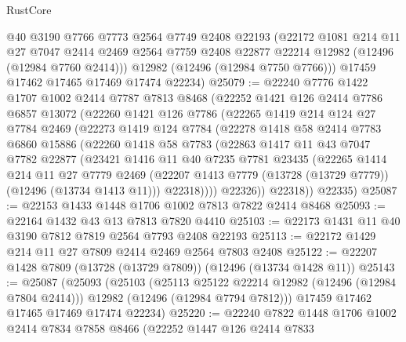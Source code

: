\begin{lexlean}{RustCore}
\begin{coremodule}
        @40
        @3190
        @7766
        @7773
        @2564
        @7749
        @2408
        @22193
        (@22172
          @1081
          @214
          @11
          @27
          @7047
          @2414
          @2469
          @2564
          @7759
          @2408
          @22877
          @22214
          @12982
          (@12496 (@12984 @7760 @2414)))
        @12982
        (@12496 (@12984 @7750 @7766)))
      @17459
      @17462
      @17465
      @17469
      @17474
      @22234)
@25079 := @22240
    @7776
    @1422
    @1707
    @1002
    @2414
    @7787
    @7813
    @8468
    (@22252
      @1421
      @126
      @2414
      @7786
      @6857
      @13072
      (@22260
        @1421
        @126
        @7786
        (@22265
          @1419
          @214
          @124
          @27
          @7784
          @2469
          (@22273
            @1419
            @124
            @7784
            (@22278
              @1418
              @58
              @2414
              @7783
              @6860
              @15886
              (@22260
                @1418
                @58
                @7783
                (@22863
                  @1417
                  @11
                  @43
                  @7047
                  @7782
                  @22877
                  (@23421
                    @1416
                    @11
                    @40
                    @7235
                    @7781
                    @23435
                    (@22265
                      @1414
                      @214
                      @11
                      @27
                      @7779
                      @2469
                      (@22207 @1413 @7779 (@13728 (@13729 @7779)) (@12496 (@13734 @1413 @11)))
                      @22318))))
              @22326))
          @22318))
      @22335)
@25087 := @22153 @1433 @1448 @1706 @1002 @7813 @7822 @2414 @8468
@25093 := @22164 @1432 @43 @13 @7813 @7820 @4410
@25103 := @22173 @1431 @11 @40 @3190 @7812 @7819 @2564 @7793 @2408 @22193
@25113 := @22172 @1429 @214 @11 @27 @7809 @2414 @2469 @2564 @7803 @2408
@25122 := @22207 @1428 @7809 (@13728 (@13729 @7809)) (@12496 (@13734 @1428 @11))
@25143 := @25087
    (@25093
      (@25103
        (@25113 @25122 @22214 @12982 (@12496 (@12984 @7804 @2414)))
        @12982
        (@12496 (@12984 @7794 @7812)))
      @17459
      @17462
      @17465
      @17469
      @17474
      @22234)
@25220 := @22240
    @7822
    @1448
    @1706
    @1002
    @2414
    @7834
    @7858
    @8466
    (@22252
      @1447
      @126
      @2414
      @7833

\end{coremodule}
\end{lexlean}
